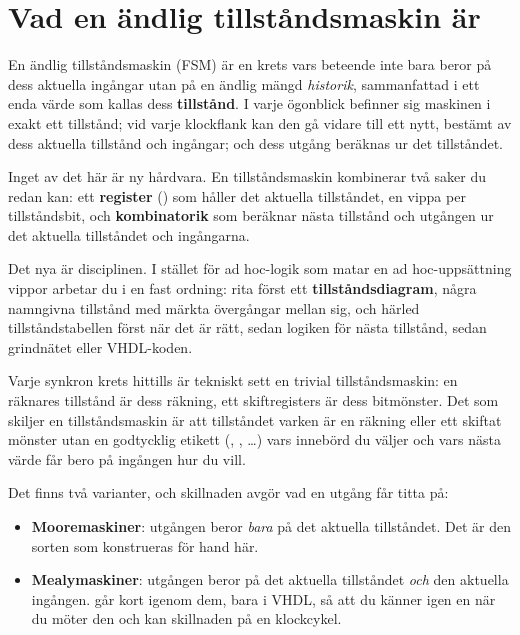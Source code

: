 
\section{Vad en ändlig tillståndsmaskin är}
\label{c8:sec:what}

En ändlig tillståndsmaskin (FSM) är en krets vars beteende inte bara beror på dess aktuella ingångar
utan på en ändlig mängd \emph{historik}, sammanfattad i ett enda värde som kallas dess
\textbf{tillstånd}. I varje ögonblick befinner sig maskinen i exakt ett tillstånd; vid varje
klockflank kan den gå vidare till ett nytt, bestämt av dess aktuella tillstånd och ingångar; och
dess utgång beräknas ur det tillståndet.

Inget av det här är ny hårdvara. En tillståndsmaskin kombinerar två saker du redan kan: ett
\textbf{register} () som håller det aktuella tillståndet, en vippa per tillståndsbit,
och \textbf{kombinatorik} som beräknar nästa tillstånd och utgången ur det aktuella tillståndet och
ingångarna.

Det nya är disciplinen. I stället för ad hoc-logik som matar en ad hoc-uppsättning vippor arbetar du
i en fast ordning: rita först ett \textbf{tillståndsdiagram}, några namngivna tillstånd med märkta
övergångar mellan sig, och härled tillståndstabellen först när det är rätt, sedan logiken för nästa
tillstånd, sedan grindnätet eller VHDL-koden.

Varje synkron krets hittills är tekniskt sett en trivial tillståndsmaskin: en räknares tillstånd är
dess räkning, ett skiftregisters är dess bitmönster. Det som skiljer en tillståndsmaskin är att
tillståndet varken är en räkning eller ett skiftat mönster utan en godtycklig etikett
(, , \dots) vars innebörd du väljer och vars nästa värde får bero
på ingången hur du vill.

Det finns två varianter, och skillnaden avgör vad en utgång får titta på:
\begin{itemize}
  \item \textbf{Mooremaskiner}: utgången beror \emph{bara} på det aktuella tillståndet. Det är den
    sorten som konstrueras för hand här.
  \item \textbf{Mealymaskiner}: utgången beror på det aktuella tillståndet \emph{och} den aktuella
    ingången.  går kort igenom dem, bara i VHDL, så att du känner igen en när
    du möter den och kan skillnaden på en klockcykel.
\end{itemize}


